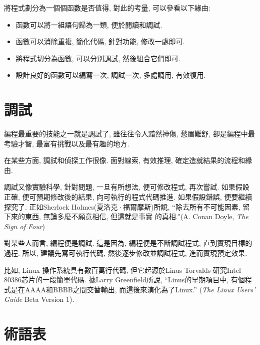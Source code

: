 \documentclass[10pt]{book}
\begin{document}
將程式劃分為一個個函數是否值得, 對此的考量, 可以參看以下緣由:

\begin{itemize}

\item 函數可以將一組語句歸為一類, 便於閱讀和調試. 

\item 函數可以消除重複, 簡化代碼, 針對功能, 修改一處即可. 

\item 將程式切分為函數, 可以分別調試, 然後組合它們即可. 

\item 設計良好的函數可以編寫一次, 調試一次, 多處調用, 有效復用. 

\end{itemize}


\section{調試}

編程最重要的技能之一就是調試了, 雖往往令人黯然神傷, 愁眉難舒, 
卻是編程中最考驗才智, 最富有挑戰以及最有趣的地方.

在某些方面, 調試和偵探工作很像. 面對線索, 有效推理, 確定造就結果的流程和緣由. 

調試又像實驗科學, 針對問題, 一旦有所想法, 便可修改程式, 再次嘗試. 
如果假設正確, 便可預期修改後的結果, 向可執行的程式代碼推進. 
如果假設錯誤, 便要繼續探究了. 正如Sherlock Holmes(夏洛克·福爾摩斯)所說, 
``除去所有不可能因素, 留下來的東西, 無論多麼不願意相信, 但這就是事實
的真相."(A. Conan Doyle, {\em The Sign of Four})

對某些人而言, 編程便是調試. 這是因為, 編程便是不斷調試程式, 直到實現目標的過程. 
所以, 建議先寫可執行代碼, 然後逐步修改並調試程式, 進而實現預定效果. 

比如, Linux 操作系統具有數百萬行代碼,  但它起源於Linus Torvalds
研究Intel 80386芯片的一段簡單代碼. 據Larry Greenfield所說, 
``Linus的早期項目中, 有個程式是在AAAA和BBBB之間交替輸出, 而這後來演化為了Linux.''
({\em The Linux Users' Guide} Beta Version 1).


\section{術語表}
\end{document}
